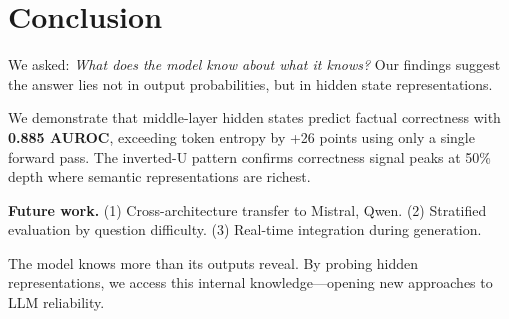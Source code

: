 \section{Conclusion}

We asked: \emph{What does the model know about what it knows?} Our findings suggest the answer lies not in output probabilities, but in hidden state representations.

We demonstrate that middle-layer hidden states predict factual correctness with \textbf{0.885 AUROC}, exceeding token entropy by +26 points using only a single forward pass. The inverted-U pattern confirms correctness signal peaks at 50\% depth where semantic representations are richest.

\textbf{Future work.} (1) Cross-architecture transfer to Mistral, Qwen. (2) Stratified evaluation by question difficulty. (3) Real-time integration during generation.

The model knows more than its outputs reveal. By probing hidden representations, we access this internal knowledge---opening new approaches to LLM reliability.
